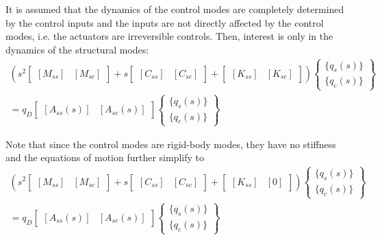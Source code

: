 It is assumed that the dynamics of the control modes are completely determined by the control inputs and the inputs are not directly affected by the control modes, i.e. the actuators are irreversible controls. Then, interest is only in the dynamics of the structural modes:
\begin{multline}
    \left( s^2 \begin{bmatrix}
        [M_{ss}] & [M_{sc}]
    \end{bmatrix} + s \begin{bmatrix}
        [C_{ss}] & [C_{sc}]
    \end{bmatrix} + \begin{bmatrix}
        [K_{ss}] & [K_{sc}]
    \end{bmatrix} \right) \begin{Bmatrix}
        \{q_s(s)\} \\
        \{q_c(s)\}
    \end{Bmatrix} \\ = q_D \begin{bmatrix}
        [A_{ss}(s)] & [A_{sc}(s)]
    \end{bmatrix} \begin{Bmatrix}
        \{q_s(s)\} \\
        \{q_c(s)\}
    \end{Bmatrix}
\end{multline}

Note that since the control modes are rigid-body modes, they have no stiffness and the equations of motion further simplify to
\begin{multline}
	\label{eq:EOM}
    \left( s^2 \begin{bmatrix}
        [M_{ss}] & [M_{sc}]
    \end{bmatrix} + s \begin{bmatrix}
        [C_{ss}] & [C_{sc}]
    \end{bmatrix} + \begin{bmatrix}
        [K_{ss}] & [0]
    \end{bmatrix} \right) \begin{Bmatrix}
        \{q_s(s)\} \\
        \{q_c(s)\}
    \end{Bmatrix} \\ = q_D \begin{bmatrix}
        [A_{ss}(s)] & [A_{sc}(s)]
    \end{bmatrix} \begin{Bmatrix}
        \{q_s(s)\} \\
        \{q_c(s)\}
    \end{Bmatrix}
\end{multline}

